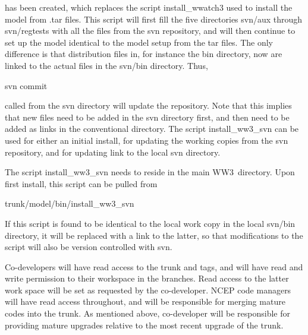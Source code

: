 \documentclass[12pt]{article}
\newcommand{\ws}{WW3}
\newcommand{\file}{\sf}
\begin{document}
\noindent
has been created, which replaces the script {\file install\_wwatch3} used to
install the model from {\file .tar} files. This script will first fill the
five directories {\file svn/aux} through {\file svn/regtests} with all the files
from the svn repository, and will then continue to set up the model identical
to the model setup from the tar files. The only difference is that
distribution files in, for instance the {\file bin} directory, now are linked
to the actual files in the {\file svn/bin} directory. Thus,

\vspace{\baselineskip}
\centerline{\file svn commit}
\vspace{\baselineskip}

\noindent
called from the {\file svn} directory will update the repository. Note that
this implies that new files need to be added in the {\file svn} directory
first, and then need to be added as links in the conventional directory. The
script {\file install\_ww3\_svn} can be used for either an initial install,
for updating the working copies from the svn repository, and for updating link
to the local {\file svn} directory.

The script {\file install\_ww3\_svn} needs to reside in the main \ws\
directory. Upon first install, this script can be pulled from

\vspace{\baselineskip}
\centerline{\file trunk/model/bin/install\_ww3\_svn}
\vspace{\baselineskip}

\noindent
If this script is found to be identical to the local work copy in the local
{\file svn/bin} directory, it will be replaced with a link to the latter, so
that modifications to the script will also be version controlled with svn.

Co-developers will have read access to the {\file trunk} and {\file tags}, and
will have read and write permission to their workspace in the {\file
branches}. Read access to the latter work space will be set as requested by
the co-developer. NCEP code managers will have read access throughout, and
will be responsible for merging mature codes into the {\file trunk}. As
mentioned above, co-developer will be responsible for providing mature
upgrades relative to the most recent upgrade of the {\file trunk}.
\end{document}

